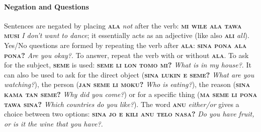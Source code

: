\documentclass[10pt,a4paper]{article}
\begin{document}
\paragraph{Negation and Questions}

Sentences are negated by placing \textbf{\textsc{ala}} \textit{not} after the verb: \textbf{\textsc{mi wile ala tawa musi}} \textit{I don't want to dance}; it essentially acts as an adjective (like also \textbf{\textsc{ali}} \textit{all}). Yes/No questions are formed by repeating the verb after \textbf{\textsc{ala}}: \textbf{\textsc{sina pona ala pona?}} \textit{Are you okay?}. To answer, repeat the verb with or without \textbf{\textsc{ala}}. To ask for the subject, \textbf{\textsc{seme}} is used: \textbf{\textsc{seme li lon tomo mi?}} \textit{What is in my house?}. It can also be used to ask for the direct object (\textbf{\textsc{sina lukin e seme?}} \textit{What are you watching?}), the person (\textbf{\textsc{jan seme li moku?}} \textit{Who is eating?}), the reason (\textbf{\textsc{sina kama tan seme?}} \textit{Why did you come?}) or for a specific thing (\textbf{\textsc{ma seme li pona tawa sina?}} \textit{Which countries do you like?}). The word \textbf{\textsc{anu}} \textit{either/or} gives a choice between two options: \textbf{\textsc{sina jo e kili anu telo nasa?}} \textit{Do you have fruit, or is it the wine that you have?}.
\end{document}
